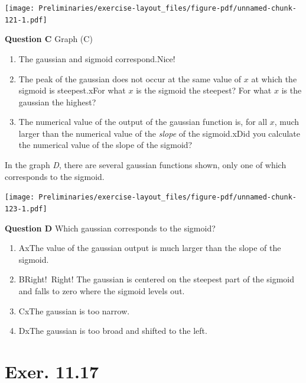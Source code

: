 \documentclass[
  letterpaper,
  DIV=11,
  numbers=noendperiod,
  oneside]{article}
\providecommand{\tightlist}{%
  \setlength{\itemsep}{0pt}\setlength{\parskip}{0pt}}\usepackage{longtable,booktabs,array}
\begin{document}
\begin{multicols}{2}
\texttt{[image: Preliminaries/exercise-layout\_files/figure-pdf/unnamed-chunk-121-1.pdf]}

\textbf{Question C} Graph (C)

\begin{enumerate}
\def\labelenumi{\roman{enumi}.}
\tightlist
\item
  {The gaussian and sigmoid correspond.{Nice!~}}\\
\item
  {The peak of the gaussian does not occur at the same value of \(x\) at
  which the sigmoid is steepest.{xFor what \(x\) is the sigmoid the
  steepest? For what \(x\) is the gaussian the highest?}}\\
\item
  {The numerical value of the output of the gaussian function is, for
  all \(x\), much larger than the numerical value of the \emph{slope} of
  the sigmoid.{xDid you calculate the numerical value of the slope of
  the sigmoid?}}
\end{enumerate}

In the graph \emph{D}, there are several gaussian functions shown, only
one of which corresponds to the sigmoid.

\texttt{[image: Preliminaries/exercise-layout\_files/figure-pdf/unnamed-chunk-123-1.pdf]}

\textbf{Question D} Which gaussian corresponds to the sigmoid?

\begin{enumerate}
\def\labelenumi{\roman{enumi}.}
\tightlist
\item
  {A{xThe value of the gaussian output is much larger than the slope
  of the sigmoid.}}\\
\item
  {B{Right!~Right! The gaussian is centered on the steepest part of the
  sigmoid and falls to zero where the sigmoid levels out.}}\\
\item
  {C{xThe gaussian is too narrow.}}\\
\item
  {D{xThe gaussian is too broad and shifted to the left.}}
\end{enumerate}

\hypertarget{exer.-11.17}{%
\section*{Exer. 11.17}\label{exer.-11.17}}


\end{multicols}
\end{document}
